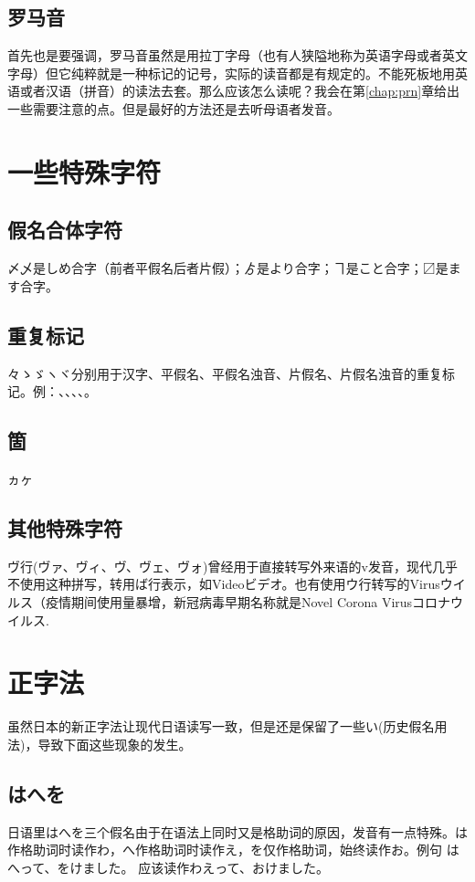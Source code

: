 \documentclass[12pt, a4paper, oneside]{book}
\newcommand{\jp}{\CJKfamily{zj}}
\begin{document}
\subsection{罗马音}
首先也是要强调，罗马音虽然是用拉丁字母（也有人狭隘地称为英语字母或者英文字母）但它纯粹就是一种标记的记号，实际的读音都是有规定的。不能死板地用英语或者汉语（拼音）的读法去套。那么应该怎么读呢？我会在第\ref{chap:prn}章给出一些需要注意的点。但是最好的方法还是去听母语者发音。
\section{一些特殊字符}
\subsection{假名合体字符}
〆乄是しめ合字（前者平假名后者片假）；{\jp ゟ}是より合字；ヿ是こと合字；〼是ます合字。
\subsection{重复标记}
々ゝゞヽヾ分别用于汉字、平假名、平假名浊音、片假名、片假名浊音的重复标记。例：{\jp {}、、、、}。
\subsection{箇}
ヵヶ
\subsection{其他特殊字符}
ヴ行(ヴァ、ヴィ、ヴ、ヴェ、ヴォ)曾经用于直接转写外来语的v发音，现代几乎不使用这种拼写，转用ば行表示，如Videoビデオ。也有使用ウ行转写的Virusウイルス（疫情期间使用量暴增，新冠病毒早期名称就是Novel Corona Virus{\jp {}コロナウイルス}.
\section{正字法}
虽然日本的新正字法让现代日语读写一致，但是还是保留了一些{\jp {}い}(历史假名用法)，导致下面这些现象的发生。
\subsection{はへを}
日语里はへを三个假名由于在语法上同时又是格助词的原因，发音有一点特殊。は作格助词时读作わ，へ作格助词时读作え，を仅作格助词，始终读作お。例句
{\jp {}はへって、をけました。}
应该读作{\jp {}わえって、おけました。}
\end{document}
